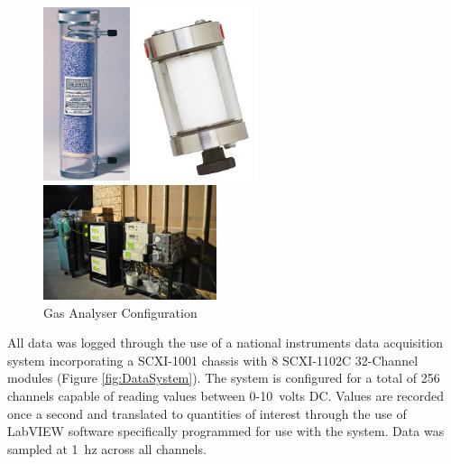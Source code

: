 \documentclass[12pt,oneside]{book}
\begin{document}
\begin{figure}[H]
	\begin{minipage}[b]{0.5\linewidth}
		\centering
		\includegraphics[height = 2in]{0_Images/Instrumentation/Gas_Analyzer/DriRightTube.jpg}	
	\end{minipage}

	\begin{minipage}[b]{0.5\linewidth}
		\centering
		\includegraphics[height = 2in]{0_Images/Instrumentation/Gas_Analyzer/FineFilter.jpg}
	\end{minipage}

	\begin{minipage}[b]{0.5\linewidth}
	\centering
		\includegraphics[width = 2in]{0_Images/Instrumentation/Gas_Analyzer/GasAnalyzers.jpg}
	\end{minipage}
	\caption{Gas Analyser Configuration}
	\label{fig:GasAnalyzers}

\end{figure}

All data was logged through the use of a national instruments data acquisition system incorporating a SCXI-1001 chassis with 8 SCXI-1102C 32-Channel modules (Figure \ref{fig:DataSystem}). The system is configured for a total of 256 channels capable of reading values between 0-10~volts DC. Values are recorded once a second and translated to quantities of interest through the use of LabVIEW software specifically programmed for use with the system. Data was sampled at 1~hz across all channels.
\end{document}
